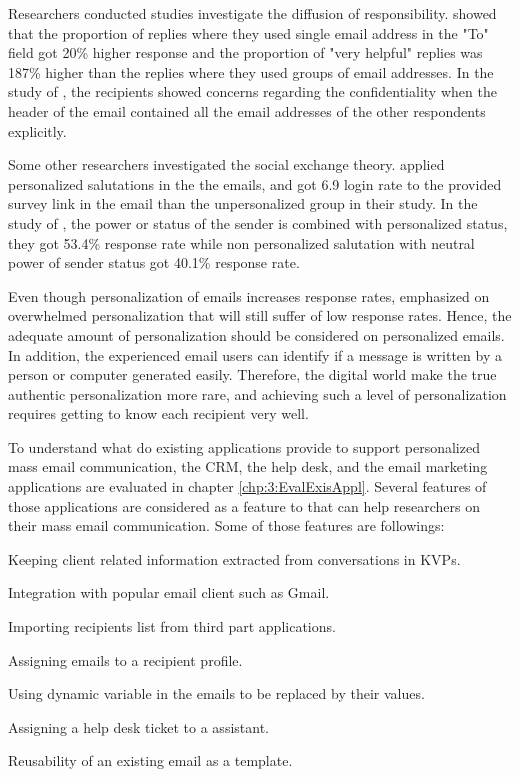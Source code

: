Researchers conducted studies investigate the diffusion of responsibility. \cite{Barron2002} showed that the proportion of replies where they used single email address in the "To" field got 20\% higher response and  the proportion of
"very helpful" replies was 187\% higher than the replies where they used groups of email addresses. In the study of \cite{Selm2006}, the recipients showed concerns regarding the confidentiality when the header of the email contained all the email addresses of the other respondents explicitly.
\vspace{1cm}

Some other researchers investigated the social exchange theory. \cite{Heerwegh2005} applied personalized salutations in the the emails, and got 6.9%
login rate to the provided survey link in the email than the unpersonalized group in their study. In the study of \cite{Joinson2007}, the power or status of the sender is combined with personalized status, they got 53.4\% response rate while non personalized salutation with neutral power of sender status got 40.1\% response rate.
\vspace{1cm}

Even though personalization of emails increases response rates, \cite{DillmanDonA.SmythJoleneD.Christian2009} emphasized on overwhelmed personalization that will still suffer of low response rates. Hence,  the adequate amount of personalization should be considered on personalized emails. In addition, the experienced email users can identify if a message is written by a person or computer generated easily. Therefore, the digital world make the true authentic personalization more rare, and achieving such a level of personalization requires getting to know each recipient very well.
\vspace{1cm}

To understand what do existing applications provide to support personalized mass email communication, the \ac{CRM}, the help desk, and the email marketing applications are evaluated in chapter \ref{chp:3:EvalExisAppl}. Several features of those applications are considered as a feature to that can help researchers on their mass email communication. Some of those features are followings:

\begin{compactitem}
	\item Keeping client related information extracted from conversations in \ac{KVP}s.
	\item Integration with popular email client such as Gmail.
	\item Importing recipients list from third part applications.
	\item Assigning emails to a recipient profile.
	\item Using dynamic variable in the emails to be replaced by their values.
	\item Assigning a help desk ticket to a assistant.
	\item Reusability of an existing email as a template.
\end{compactitem}
\vspace{1cm}

